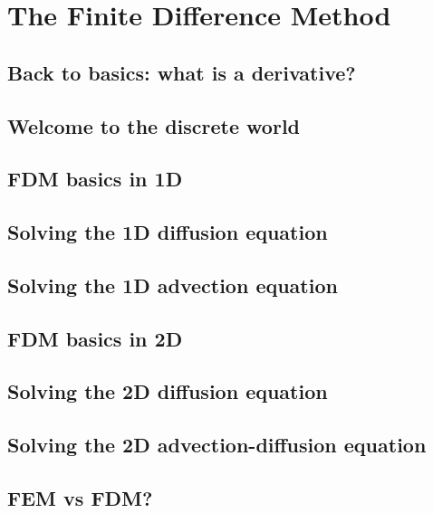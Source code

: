 \chapter{The Finite Difference Method} %

\section{Back to basics: what is a derivative?} 
\section{Welcome to the discrete world} 
\section{FDM basics in 1D} \label{ss:fdm_basics1D}  
\section{Solving the 1D diffusion equation} \label{ss:fdm_diff1D} 
\section{Solving the 1D advection equation} \label{ss:fdm_adv1D} 
\newpage
\section{FDM basics in 2D} \label{ss:fdm_basics2D}  
\newpage
\section{Solving the 2D diffusion equation} \label{ss:fdm_diff2D} 
\section{Solving the 2D advection-diffusion equation} \label{ss:fdm_advdiff2D} 

\newpage
\section{FEM vs FDM?}\label{ss:femvsfdm}   
